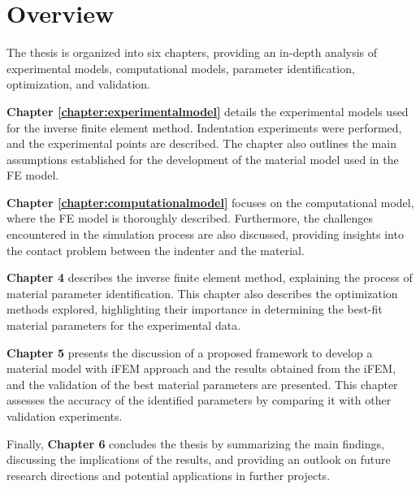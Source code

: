 \section{Overview}
The thesis is organized into six chapters, providing an in-depth analysis of experimental models, computational models, 
parameter identification, optimization, and validation. 

\textbf{Chapter \ref{chapter:experimentalmodel}} details the experimental models used for the inverse finite element method. 
Indentation experiments were performed, and the experimental points are described. The chapter also outlines 
the main assumptions established for the development of the material model used in the FE model.

\textbf{Chapter \ref{chapter:computationalmodel}} focuses on the computational model, where the FE model is thoroughly described. 
Furthermore, the challenges encountered in the simulation process are also discussed, providing insights into 
the contact problem between the indenter and the material.

\textbf{Chapter 4} describes the inverse finite element method, explaining the process of material parameter identification. 
This chapter also describes the optimization methods explored, highlighting their importance in determining the best-fit 
material parameters for the experimental data.

\textbf{Chapter 5} presents the discussion of a proposed framework to develop a material model with iFEM approach 
and the results obtained from the iFEM, and the validation of the best material parameters are presented. 
This chapter assesses the accuracy of the identified parameters by comparing it with other validation experiments.

Finally, \textbf{Chapter 6} concludes the thesis by summarizing the main findings, discussing the implications of the results, 
and providing an outlook on future research directions and potential applications in further projects.